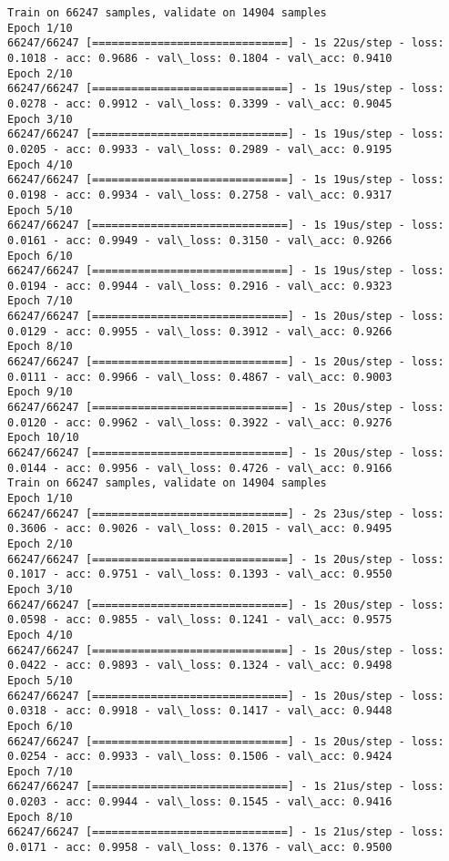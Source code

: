 \documentclass[11pt]{article}
\begin{document}
    \begin{Verbatim}[commandchars=\\\{\}]
Train on 66247 samples, validate on 14904 samples
Epoch 1/10
66247/66247 [==============================] - 1s 22us/step - loss: 0.1018 - acc: 0.9686 - val\_loss: 0.1804 - val\_acc: 0.9410
Epoch 2/10
66247/66247 [==============================] - 1s 19us/step - loss: 0.0278 - acc: 0.9912 - val\_loss: 0.3399 - val\_acc: 0.9045
Epoch 3/10
66247/66247 [==============================] - 1s 19us/step - loss: 0.0205 - acc: 0.9933 - val\_loss: 0.2989 - val\_acc: 0.9195
Epoch 4/10
66247/66247 [==============================] - 1s 19us/step - loss: 0.0198 - acc: 0.9934 - val\_loss: 0.2758 - val\_acc: 0.9317
Epoch 5/10
66247/66247 [==============================] - 1s 19us/step - loss: 0.0161 - acc: 0.9949 - val\_loss: 0.3150 - val\_acc: 0.9266
Epoch 6/10
66247/66247 [==============================] - 1s 19us/step - loss: 0.0194 - acc: 0.9944 - val\_loss: 0.2916 - val\_acc: 0.9323
Epoch 7/10
66247/66247 [==============================] - 1s 20us/step - loss: 0.0129 - acc: 0.9955 - val\_loss: 0.3912 - val\_acc: 0.9266
Epoch 8/10
66247/66247 [==============================] - 1s 20us/step - loss: 0.0111 - acc: 0.9966 - val\_loss: 0.4867 - val\_acc: 0.9003
Epoch 9/10
66247/66247 [==============================] - 1s 20us/step - loss: 0.0120 - acc: 0.9962 - val\_loss: 0.3922 - val\_acc: 0.9276
Epoch 10/10
66247/66247 [==============================] - 1s 20us/step - loss: 0.0144 - acc: 0.9956 - val\_loss: 0.4726 - val\_acc: 0.9166
Train on 66247 samples, validate on 14904 samples
Epoch 1/10
66247/66247 [==============================] - 2s 23us/step - loss: 0.3606 - acc: 0.9026 - val\_loss: 0.2015 - val\_acc: 0.9495
Epoch 2/10
66247/66247 [==============================] - 1s 20us/step - loss: 0.1017 - acc: 0.9751 - val\_loss: 0.1393 - val\_acc: 0.9550
Epoch 3/10
66247/66247 [==============================] - 1s 20us/step - loss: 0.0598 - acc: 0.9855 - val\_loss: 0.1241 - val\_acc: 0.9575
Epoch 4/10
66247/66247 [==============================] - 1s 20us/step - loss: 0.0422 - acc: 0.9893 - val\_loss: 0.1324 - val\_acc: 0.9498
Epoch 5/10
66247/66247 [==============================] - 1s 20us/step - loss: 0.0318 - acc: 0.9918 - val\_loss: 0.1417 - val\_acc: 0.9448
Epoch 6/10
66247/66247 [==============================] - 1s 20us/step - loss: 0.0254 - acc: 0.9933 - val\_loss: 0.1506 - val\_acc: 0.9424
Epoch 7/10
66247/66247 [==============================] - 1s 21us/step - loss: 0.0203 - acc: 0.9944 - val\_loss: 0.1545 - val\_acc: 0.9416
Epoch 8/10
66247/66247 [==============================] - 1s 21us/step - loss: 0.0171 - acc: 0.9958 - val\_loss: 0.1376 - val\_acc: 0.9500

\end{Verbatim}
\end{document}
